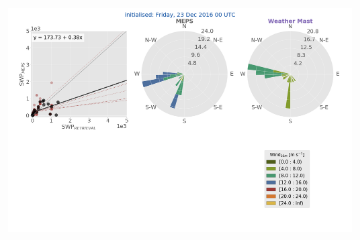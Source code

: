 \begin{figure}[h]
\begin{subfigure}[b]{0.84\textwidth}
		\caption{}\label{fig:wind22}
	\end{subfigure}
	\newline
	\begin{subfigure}[b]{0.84\textwidth}
		\includegraphics[trim={2.3cm 19.5cm 2.cm .7cm},clip,width=\textwidth]{./fig_windrose/20161223}
		\caption{}\label{fig:wind23}
	\end{subfigure}
\end{figure}
%

